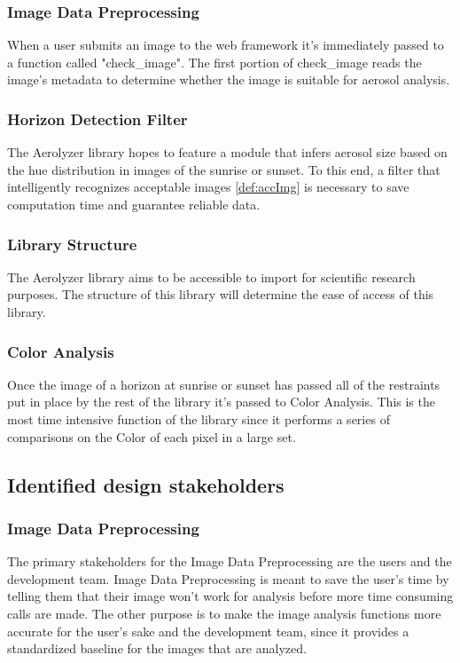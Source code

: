 \documentclass[onecolumn, draftclsnofoot,10pt, compsoc]{IEEEtran}
\begin{document}
\begin{singlespace}
    	\subsubsection{Image Data Preprocessing}
        When a user submits an image to the web framework it's immediately passed to a function called "check\_image".
		The first portion of check\_image reads the image's metadata to determine whether the image is suitable for aerosol analysis.
        \subsubsection{Horizon Detection Filter}
        The Aerolyzer library hopes to feature a module that infers aerosol size based on the hue distribution in images of the sunrise or sunset. To this end, a filter that intelligently recognizes acceptable images \ref{def:accImg} is necessary to save computation time and guarantee reliable data.
        \subsubsection{Library Structure}
        The Aerolyzer library aims to be accessible to import for scientific research purposes. The structure of this library will determine the ease of access of this library.
		\subsubsection{Color Analysis}
        Once the image of a horizon at sunrise or sunset has passed all of the restraints put in place by the rest of the library it's passed to Color Analysis. This is the most time intensive function of the library since it performs a series of comparisons on the Color of each pixel in a large set.
	\subsection{Identified design stakeholders}
    	\subsubsection{Image Data Preprocessing}
        The primary stakeholders for the Image Data Preprocessing are the users and the development team.
		Image Data Preprocessing is meant to save the user's time by telling them that their image won't work for analysis before more time consuming calls are made.
		The other purpose is to make the image analysis functions more accurate for the user's sake and the development team, since it provides a standardized baseline for the images that are analyzed.

\end{singlespace}
\end{document}
